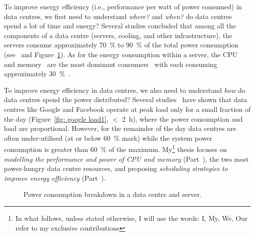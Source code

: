 To improve energy efficiency (i.e., performance per watt of power consumed) in data
centres, we first need to understand \emph{where?} and \emph{when?} do data centres spend
a lot of time and energy? Several studies concluded that among all the components of a
data centre (servers, cooling, and other infrastructure), the servers consume
approximately \SI{70}{\percent} to \SI{90}{\percent} of the total power consumption
(see~\citep{fblue} and Figure~\ref{fig: breakdown}).  As for the energy consumption within
a server, the CPU~\citep{Lefurgy:2003:EMC:957964.957972} and memory~\citep{6557176,
4658648} are the most dominant consumers~\citep{Barroso2013TheEdition} with each consuming
approximately \SI{30}{\percent}~\citep{5510883}. 

 To improve energy efficiency in data centres, we also need to understand
\emph{how} do data centres spend the power distributed? Several
studies~\citep{Petrucci2015Octopus-Man:Computers, Delimitrou2014Quasar,
Prekas:2015:EPW:2806777.2806848, Barroso2003WebArchitecture} have shown that data centres
like Google and Facebook operate at peak load only for a small fraction of the day
(Figure~\ref{fig: google load1}, $<$ \SI{2}{\hour}), where the power consumption and load
are proportional. However, for the remainder of the day data centres are often
under-utilised (at or below \SI{60}{\percent} mark) while the system power consumption is
greater than \SI{60}{\percent} of the maximum.  My\footnote{In what follows, unless stated
otherwise, I will use the words: I, My, We, Our refer to my exclusive contributions}
thesis focuses on \emph{modelling the performance and power of CPU and memory}
(Part~), the two most power-hungry data centre resources, and proposing
\emph{scheduling strategies to improve energy efficiency} (Part~).

\begin{figure}[t]
    \centering
{}
    \caption[Power consumption breakdown]{Power consumption breakdown in a data centre and server.}
    \label{fig: breakdown}
\end{figure}

